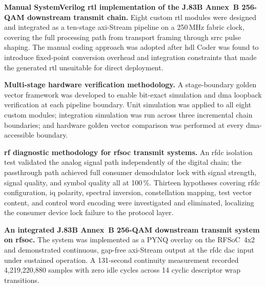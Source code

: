 \begin{tightemize}

  \item \textbf{Manual SystemVerilog \ac{rtl} implementation of
        the J.83B Annex~B 256-QAM downstream transmit chain.}
        Eight custom \ac{rtl} modules were designed and integrated
        as a ten-stage \ac{axi}-Stream pipeline on a 250\,MHz
        fabric clock, covering the full processing path from
        transport framing through \ac{srrc} pulse shaping.
        The manual coding approach was adopted after
        \ac{hdl} Coder was found to introduce fixed-point
        conversion overhead and integration constraints that made
        the generated \ac{rtl} unsuitable for direct deployment.

  \item \textbf{Multi-stage hardware verification methodology.}
        A stage-boundary golden vector framework was developed
        to enable bit-exact simulation and \ac{dma} loopback
        verification at each pipeline boundary.
        Unit simulation was applied to all eight custom modules;
        integration simulation was run across three incremental
        chain boundaries; and hardware golden vector comparison
        was performed at every \ac{dma}-accessible boundary.

  \item \textbf{\ac{rf} diagnostic methodology for \ac{rfsoc}
        transmit systems.}
        An \ac{rfdc} isolation test validated the analog signal
        path independently of the digital chain; the passthrough
        path achieved full consumer demodulator lock with
        signal strength, signal quality, and symbol quality all
        at 100\,\%.
        Thirteen hypotheses covering \ac{rfdc} configuration,
        \ac{iq} polarity, spectral inversion, constellation
        mapping, test vector content, and control word encoding
        were investigated and eliminated, localizing the consumer
        device lock failure to the protocol layer.

  \item \textbf{An integrated J.83B Annex~B 256-QAM downstream
        transmit system on \ac{rfsoc}.}
        The system was implemented as a PYNQ overlay on the
        RFSoC~4x2 and demonstrated continuous, gap-free
        \ac{axi}-Stream output at the \ac{rfdc} \ac{dac} input
        under sustained operation.
        A 131-second continuity measurement recorded
        4,219,220,880 samples with zero idle cycles across
        14 cyclic descriptor wrap transitions.

\end{tightemize}

